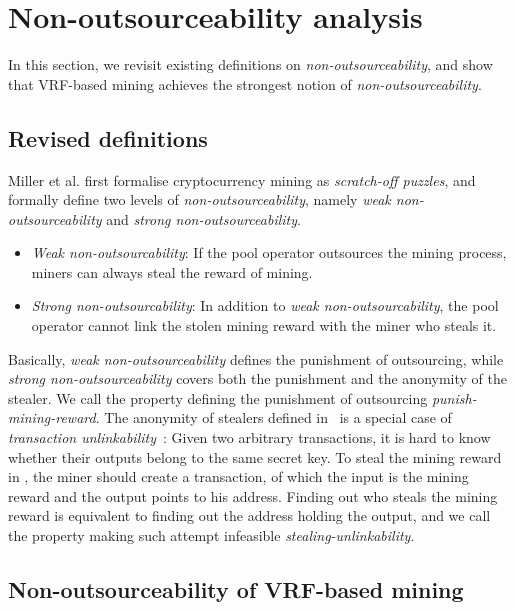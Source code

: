 \section{Non-outsourceability analysis}
\label{sec:non_outsourceability}

In this section, we revisit existing definitions on \emph{non-outsourceability}, and show that VRF-based mining achieves the strongest notion of \emph{non-outsourceability}.

\subsection{Revised definitions}

Miller et al. \cite{miller2015nonoutsourceable} first formalise cryptocurrency mining as \emph{scratch-off puzzles}, and formally define two levels of \emph{non-outsourceability}, namely \emph{weak non-outsourceability} and \emph{strong non-outsourceability}.

\begin{itemize}
    \item \emph{Weak non-outsourcability}: If the pool operator outsources the mining process, miners can always steal the reward of mining.
    \item \emph{Strong non-outsourcability}: In addition to \emph{weak non-outsourcability}, the pool operator cannot link the stolen mining reward with the miner who steals it.
\end{itemize}

Basically, \emph{weak non-outsourceability} defines the punishment of outsourcing, while \emph{strong non-outsourceability} covers both the punishment and the anonymity of the stealer.
We call the property defining the punishment of outsourcing \emph{punish-mining-reward}.
The anonymity of stealers defined in~\cite{miller2015nonoutsourceable} is a special case of \emph{transaction unlinkability}~\cite{van2013cryptonote}: Given two arbitrary transactions, it is hard to know whether their outputs belong to the same secret key.
To steal the mining reward in \cite{miller2015nonoutsourceable}, the miner should create a transaction, of which the input is the mining reward and the output points to his address.
Finding out who steals the mining reward is equivalent to finding out the address holding the output, and we call the property making such attempt infeasible \emph{stealing-unlinkability}.




\subsection{Non-outsourceability of VRF-based mining}


